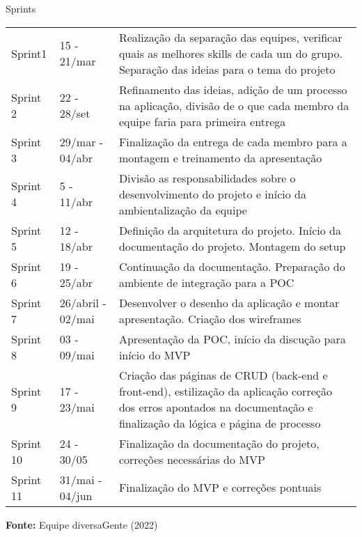 \begin{quadro}[htb]
	\centering
	\ABNTEXfontereduzida
	\caption[Sprints]{Sprints}
	\label{quadro-atividades}
	\begin{tabular}{|p{1.5cm}|p{3.0cm}|p{10.0cm}|}
		\hline
		\thead{Sprints} & \thead{Período}  & \thead{Atividades} \\
		\hline
		Sprint1 & 15 - 21/mar  & Realização da separação das equipes, verificar quais as melhores skills de cada um do grupo. Separação das ideias para o tema do projeto   \\
		\hline
		Sprint 2 & 22 - 28/set & Refinamento das ideias, adição de um processo na aplicação, divisão de o que cada membro da equipe faria para primeira entrega \\
		\hline
		Sprint 3 & 29/mar - 04/abr  & Finalização da entrega de cada membro para a montagem e treinamento da apresentação \\
		\hline
		Sprint 4 & 5 - 11/abr & Divisão as responsabilidades sobre o desenvolvimento do projeto e início da ambientalização da equipe \\
		\hline
		Sprint 5 & 12 - 18/abr & Definição da arquitetura do projeto. Início da documentação do projeto. Montagem do setup  \\
		\hline
		Sprint 6 & 19 - 25/abr & Continuação da documentação. Preparação do ambiente de integração para a POC \\
		\hline
		Sprint 7 & 26/abril - 02/mai & Desenvolver o desenho da aplicação e montar apresentação. Criação dos wireframes  \\
		\hline
		Sprint 8 & 03 - 09/mai  & Apresentação da POC, início da discução para início do MVP \\
		\hline
		Sprint 9 & 17 - 23/mai  & Criação das páginas de CRUD (back-end e front-end), estilização da aplicação correção dos erros apontados na documentação e finalização da lógica e página de processo  \\
		\hline
		Sprint 10 & 24 - 30/05 & Finalização da documentação do projeto, correções necessárias do MVP \\
		\hline
		Sprint 11 & 31/mai - 04/jun & Finalização do MVP e correções pontuais\\
		\hline
	\end{tabular}
	\par\medskip\ABNTEXfontereduzida\selectfont\textbf
	{Fonte:} Equipe diversaGente (2022) \par\medskip
\end{quadro}

